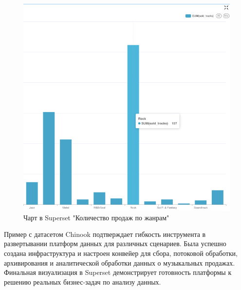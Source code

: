 \begin{enumerate}[1.]
\begin{itemize}
\begin{figure}[h]
                  \includegraphics [scale=0.5] {my_folder/images/ex2_superset_chart}
                  \caption{Чарт в Superset "Количество продаж по жанрам"}
                  \label{fig:ex2_superset_chart}
                \end{figure}
                \FloatBarrier
        \end{itemize}
\end{enumerate}

Пример с датасетом Chinook подтверждает гибкость инструмента в развертывании платформ данных для различных сценариев. Была успешно создана инфраструктура и настроен конвейер для сбора, потоковой обработки, архивирования и аналитической обработки данных о музыкальных продажах. Финальная визуализация в Superset демонстрирует готовность платформы к решению реальных бизнес-задач по анализу данных.











%
